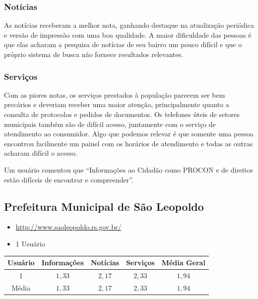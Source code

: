 \documentclass{article}
\begin{document}
\subsubsection{Notícias}

As notícias receberam a melhor nota, ganhando destaque na atualização periódica
e versão de impressão com uma boa qualidade. A maior dificuldade das pessoas é
que elas acharam a pesquisa de notícias de seu bairro um pouco difícil e que o
próprio sistema de busca não fornece resultados relevantes.

\subsubsection{Serviços}

Com as piores notas, os serviços prestados à população parecem ser bem precários
e deveriam receber uma maior atenção, principalmente quanto a consulta de
protocolos e pedidos de documentos. Os telefones úteis de setores municipais
também são de difícil acesso, juntamente com o serviço de atendimento ao
consumidor. Algo que podemos relevar é que somente uma pessoa encontrou
facilmente um painel com os horários de atendimento e todas as outras acharam
difícil o acesso.

Um usuário comentou que ``Informações ao Cidadão como PROCON e de direitos estão
difíceis de encontrar e compreender''.

\subsection{Prefeitura Municipal de São Leopoldo}

\begin{itemize}
  \item \url{http://www.saoleopoldo.rs.gov.br/}
  \item 1 Usuário
\end{itemize}

\begin{center}
    \begin{tabular}{|c|c|c|c|c|}
        \hline{} Usuário & Informações & Notícias & Serviços & Média Geral\\
        \hline{} 1 & $1,33$ & $2,17$ & $2,33$ & $1,94$\\
        \hline{} Média & $1,33$ & $2,17$ & $2,33$ & $1,94$\\\hline
    \end{tabular}
\end{center}
\end{document}
